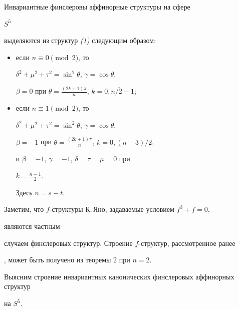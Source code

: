 \begin{thm} Инвариантные финслеровы аффинорные структуры на сфере 


$S^5$ 


выделяются из структур {\em (1)} следующим образом: 


\begin{itemize} 


\item[а)] если $n\equiv0\pmod{2}$, то 


$\delta^2+\mu^2+\tau^2=\sin^2\theta$, $\gamma=\cos\theta$, 


$\beta=0$ при $\theta=\frac{(2k+1)\pi}{n}$, $k=\overline{0,n/2-1}$; 


\item[б)] если $n\equiv1\pmod{2}$, то 


$\delta^2+\mu^2+\tau^2=\sin^2\theta$, $\gamma=\cos\theta$, 


$\beta=-1$ при $\theta=\frac{(2k+1)\pi}{n}$, $k=\overline{0,(n-3)/2}$, 


и $\beta=-1$, $\gamma=-1$, $\delta=\tau=\mu=0$ при 


$k=\frac{n-1}{2}$. 


Здесь $n=s-t$. 


\end{itemize}


\end{thm} 


 


Заметим, что $f$-структуры К.\,Яно, задаваемые условием $f^3+f=0$, 


являются частным 


случаем финслеровых структур. Строение $f$-структур, рассмотренное ранее 


\cite{Lip}, может быть получено из теоремы 2 при $n=2$. 


 


Выясним строение инвариантных канонических финслеровых аффинорных структур 


на $S^5$. 


 


